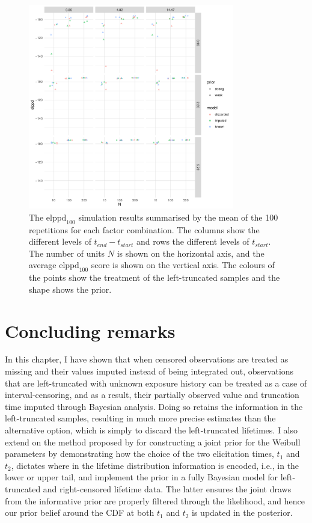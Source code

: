 \begin{figure}
    \centering
    \includegraphics[width=0.8\textwidth]{./figures/ch-2/sim-results-elppd.pdf}
    \caption{The $\text{elppd}_{100}$ simulation results summarised by the mean of the 100 repetitions for each factor combination. The columns show the different levels of $t_{end} - t_{start}$ and rows the different levels of $t_{start}$. The number of units $N$ is shown on the horizontal axis, and the average $\text{elppd}_{100}$ score is shown on the vertical axis. The colours of the points show the treatment of the left-truncated samples and the shape shows the prior.}
    \label{fig:sim-study-elppd}
\end{figure}

\section{Concluding remarks} \label{sec:weibull-conclusion}

In this chapter, I have shown that when censored observations are treated as missing and their values imputed instead of being integrated out, observations that are left-truncated with unknown exposure history can be treated as a case of interval-censoring, and as a result, their partially observed value and truncation time imputed through Bayesian analysis. Doing so retains the information in the left-truncated samples, resulting in much more precise estimates than the alternative option, which is simply to discard the left-truncated lifetimes. I also extend on the method proposed by \citet{kaminskiy2005} for constructing a joint prior for the Weibull parameters by demonstrating how the choice of the two elicitation times, $t_1$ and $t_2$, dictates where in the lifetime distribution information is encoded, i.e., in the lower or upper tail, and implement the prior in a fully Bayesian model for left-truncated and right-censored lifetime data. The latter ensures the joint draws from the informative prior are properly filtered through the likelihood, and hence our prior belief around the CDF at both $t_1$ and $t_2$ is updated in the posterior.

